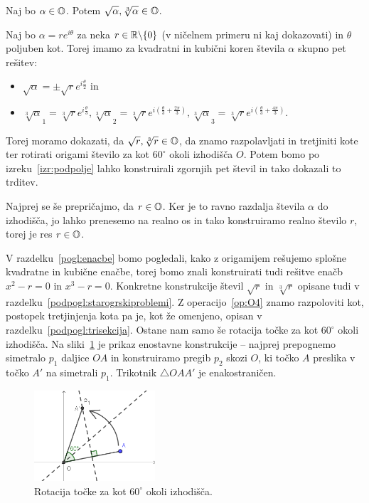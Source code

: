 \begin{trditev}
    \label{trd:zaprtost_koren}
    Naj bo $\alpha \in \mathbb O$. Potem $\sqrt{\alpha}, \sqrt[3]{\alpha} \in \mathbb O$.
\end{trditev}

\begin{dokaz}
    Naj bo $\alpha = r e^{i \theta}$ za neka $r \in \mathbb R \backslash \{0\}$ (v ničelnem primeru ni kaj dokazovati) in $\theta$ poljuben kot. Torej imamo za kvadratni in kubični koren števila $\alpha$ skupno pet rešitev:
    \begin{itemize}
        \item $\sqrt{\alpha} = \pm \sqrt{r}e^{i \frac{\theta}{2}}$ in
        \item $\sqrt[3]{\alpha}_1 = \sqrt[3]{r}e^{i \frac{\theta}{3}}, \sqrt[3]{\alpha}_2 = \sqrt[3]{r}e^{i \left(\frac{\theta}{3} + \frac{2\pi}{3}\right)}, \sqrt[3]{\alpha}_3 = \sqrt[3]{r}e^{i \left(\frac{\theta}{3} + \frac{4\pi}{3}\right)}$.
    \end{itemize}
    Torej moramo dokazati, da $\sqrt{r}, \sqrt[3]{r} \in \mathbb O$, da znamo razpolavljati in tretjiniti kote ter rotirati origami število za kot $60^\circ$ okoli izhodišča $O$. Potem bomo po izreku~\ref{izr:podpolje} lahko konstruirali zgornjih pet števil in tako dokazali to trditev.

    Najprej se še prepričajmo, da $r \in \mathbb O$. Ker je to ravno razdalja števila $\alpha$ do izhodišča, jo lahko prenesemo na realno os in tako konstruiramo realno število $r$, torej je res $r \in \mathbb O$.
    
    V razdelku~\ref{pogl:enacbe} bomo pogledali, kako z origamijem rešujemo splošne kvadratne in kubične enačbe, torej bomo znali konstruirati tudi rešitve enačb $x^2 - r = 0$ in $x^3 - r = 0$. Konkretne konstrukcije števil $\sqrt{r}$ in $\sqrt[3]{r}$ opisane tudi v razdelku~\ref{podpogl:starogrskiproblemi}. Z operacijo~\ref{op:O4} znamo razpoloviti kot, postopek tretjinjenja kota pa je, kot že omenjeno, opisan v razdelku~\ref{podpogl:trisekcija}. Ostane nam samo še rotacija točke za kot $60^\circ$ okoli izhodišča. Na sliki~\ref{fig:kot60_rotacija} je prikaz enostavne konstrukcije -- najprej prepognemo simetralo $p_1$ daljice $OA$ in konstruiramo pregib $p_2$ skozi $O$, ki točko $A$ preslika v točko $A'$ na simetrali $p_1$. Trikotnik $\triangle OAA'$ je enakostraničen. 
    \begin{figure}[h]
        \centering
        \includegraphics[width=0.4\textwidth]{images/algebra/kot60.png}
        \caption[Rotacija točke okoli izhodišča]{Rotacija točke za kot $60^\circ$ okoli izhodišča.}
        \label{fig:kot60_rotacija}
    \end{figure}
\end{dokaz}

